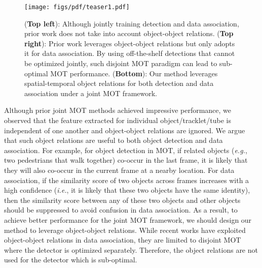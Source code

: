 \documentclass[letterpaper, 10 pt, conference]{ieeeconf}
\renewcommand\bf[1]{\textbf{#1}}
\begin{document}
\begin{figure}[t]
    \vspace{0.17cm}
    \centering
    \texttt{[image: figs/pdf/teaser1.pdf]}
    \vspace{-0.75cm}
    \caption{(\bf{Top left}): Although jointly training detection and data association, prior work does not take into account object-object relations. (\bf{Top right}): Prior work leverages object-object relations but only adopts it for data association. By using off-the-shelf detections that cannot be optimized jointly, such disjoint MOT paradigm can lead to sub-optimal MOT performance. (\bf{Bottom}): Our method leverages spatial-temporal object relations for both detection and data association under a joint MOT framework.}
    \label{fig:teaser}
    \vspace{-0.5cm}
\end{figure} 
Although prior joint MOT methods achieved impressive performance, we observed that the feature extracted for individual object/tracklet/tube is independent of one another and object-object relations are ignored. We argue that such object relations are useful to both object detection and data association. For example, for object detection in MOT, if related objects (\emph{e.g.}, two pedestrians that walk together) co-occur in the last frame, it is likely that they will also co-occur in the current frame at a nearby location. For data association, if the similarity score of two objects across frames increases with a high confidence (\emph{i.e.}, it is likely that these two objects have the same identity), then the similarity score between any of these two objects and other objects should be suppressed to avoid confusion in data association. As a result, to achieve better performance for the joint MOT framework, we should design our method to leverage object-object relations. While recent works \cite{Weng2020_gnn3dmot, Braso2020, Li2020_gn} have exploited object-object relations in data association, they are limited to disjoint MOT where the detector is optimized separately. Therefore, the object relations are not used for the detector which is sub-optimal.
\end{document}
